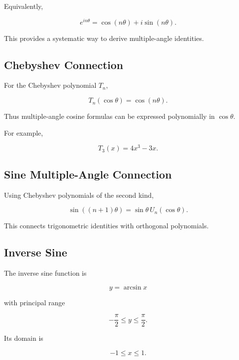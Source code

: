 Equivalently,

\[
\boxed{
e^{in\theta}
=
\cos(n\theta)
+
i\sin(n\theta).
}
\]

This provides a systematic way to derive multiple-angle identities.

\subsection{Chebyshev Connection}
\label{subsec:chebyshev-trig-connection}

For the Chebyshev polynomial \(T_n\),

\[
\boxed{
T_n(\cos\theta)
=
\cos(n\theta).
}
\]

Thus multiple-angle cosine formulas can be expressed polynomially in
\(\cos\theta\).

For example,

\[
\boxed{
T_3(x)
=
4x^3-3x.
}
\]

\subsection{Sine Multiple-Angle Connection}
\label{subsec:sine-chebyshev-connection}

Using Chebyshev polynomials of the second kind,

\[
\boxed{
\sin((n+1)\theta)
=
\sin\theta\,
U_n(\cos\theta).
}
\]

This connects trigonometric identities with orthogonal polynomials.

\subsection{Inverse Sine}
\label{subsec:inverse-sine-reference}

The inverse sine function is

\[
\boxed{
y=\arcsin x
}
\]

with principal range

\[
\boxed{
-\frac{\pi}{2}
\leq
y
\leq
\frac{\pi}{2}.
}
\]

Its domain is

\[
\boxed{
-1\leq x\leq1.
}
\]

